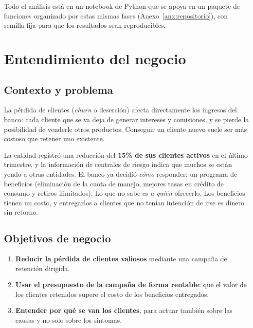 \documentclass[11pt,a4paper]{article}
\begin{document}
Todo el análisis está en un notebook de Python que se apoya en un paquete de funciones organizado por estas mismas fases (Anexo~\ref{anx:repositorio}), con semilla fija para que los resultados sean reproducibles.

\section{Entendimiento del negocio}
\label{sec:negocio}

\subsection{Contexto y problema}

La pérdida de clientes (\emph{churn} o deserción) afecta directamente los ingresos del banco: cada cliente que se va deja de generar intereses y comisiones, y se pierde la posibilidad de venderle otros productos. Conseguir un cliente nuevo suele ser más costoso que retener uno existente.

La entidad registró una reducción del \textbf{15\% de sus clientes activos} en el último trimestre, y la información de centrales de riesgo indica que muchos se están yendo a otras entidades. El banco ya decidió \emph{cómo} responder: un programa de beneficios (eliminación de la cuota de manejo, mejores tasas en crédito de consumo y retiros ilimitados). Lo que no sabe es \emph{a quién} ofrecerlo. Los beneficios tienen un costo, y entregarlos a clientes que no tenían intención de irse es dinero sin retorno.

\subsection{Objetivos de negocio}

\begin{enumerate}
  \item \textbf{Reducir la pérdida de clientes valiosos} mediante una campaña de retención dirigida.
  \item \textbf{Usar el presupuesto de la campaña de forma rentable}: que el valor de los clientes retenidos supere el costo de los beneficios entregados.
  \item \textbf{Entender por qué se van los clientes}, para actuar también sobre las causas y no solo sobre los síntomas.
\end{enumerate}
\end{document}
